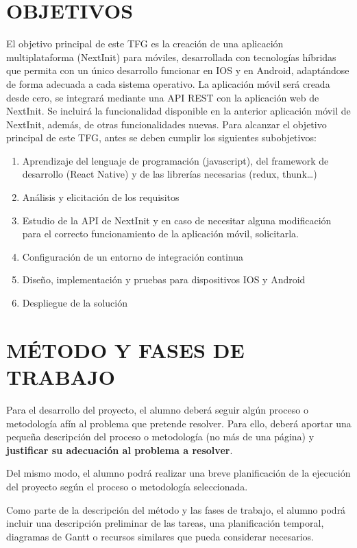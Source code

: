 \documentclass{pre-tfg}
\begin{document}
\section{OBJETIVOS}

El objetivo principal de este TFG es la creación de una aplicación multiplataforma (NextInit) para móviles,
desarrollada con tecnologías híbridas que permita con un único desarrollo funcionar en IOS y en Android,
adaptándose de forma adecuada a cada sistema operativo. La aplicación móvil será creada desde cero, se
integrará mediante una API REST con la aplicación web de NextInit. Se incluirá la funcionalidad disponible
en la anterior aplicación móvil de NextInit, además, de otras funcionalidades nuevas.
\newline\newline
Para alcanzar el objetivo principal de este TFG, antes se deben cumplir los siguientes subobjetivos:
\begin{enumerate}
  \item Aprendizaje del lenguaje de programación (javascript), del framework de desarrollo (React Native)
  y de las librerías necesarias (redux, thunk…)
  \item Análisis y elicitación de los requisitos
  \item Estudio de la API de NextInit y en caso de necesitar alguna modificación para el correcto
  funcionamiento de la aplicación móvil, solicitarla.
  \item Configuración de un entorno de integración continua
  \item Diseño, implementación y pruebas para dispositivos IOS y Android
  \item Despliegue de la solución
\end{enumerate}


\section{MÉTODO Y FASES DE TRABAJO}

Para el desarrollo del proyecto, el alumno deberá seguir algún proceso o metodología afín
al problema que pretende resolver. Para ello, deberá aportar una pequeña descripción del
proceso o metodología (no más de una página) y \textbf{justificar su adecuación al
  problema a resolver}.

Del mismo modo, el alumno podrá realizar una breve planificación de la ejecución del
proyecto según el proceso o metodología seleccionada.

Como parte de la descripción del método y las fases de trabajo, el alumno podrá incluir
una descripción preliminar de las tareas, una planificación temporal, diagramas de Gantt o
recursos similares que pueda considerar necesarios.
\end{document}
